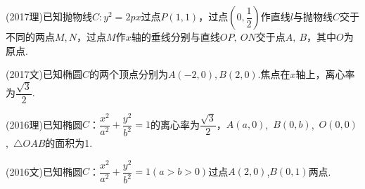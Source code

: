 \documentclass{BHCexam}
\begin{document}
\fubiaoti{}
\maketitle
 \begin{questions}
\qs (2017理)已知抛物线$ C:y^2=2px $过点$ P\left(1,1\right) $，过点$ \left(0,\dfrac{1}{2}\right) $作直线$ l $与抛物线$ C $交于不同的两点$ M,N $，过点$ M $作$x$轴的垂线分别与直线$ OP,\ ON $交于点$ A,\ B $，其中$ O $为原点.
\kongbai 
\qs (2017文)已知椭圆$C$的两个顶点分别为$ A(-2,0),B(2,0) $.焦点在$x$轴上，离心率为$ \dfrac{\sqrt{3}}{2} $.
\newpage 
\question
(2016理)已知椭圆$C$：$\dfrac{x^2}{a^2}+\dfrac{y^2}{b^2}=1$的离心率为$\dfrac{\sqrt{3}}{2}$，$A(a,0)$,~$B(0,b)$,~$O(0,0)$,~$\triangle OAB$的面积为1.
\kongbai
\question
(2016文)已知椭圆$C$：$\dfrac{x^2}{a^2}+\dfrac{y^2}{b^2}=1(a>b>0)$过点$A(2,0)$,$B(0,1)$两点.
\begin{parts}

\end{parts}
\end{questions}
\end{document}
